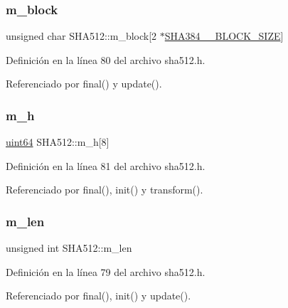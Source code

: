 \subsubsection{\texorpdfstring{m\+\_\+block}{m\_block}}
{\footnotesize\ttfamily unsigned char S\+H\+A512\+::m\+\_\+block\mbox{[}2 $\ast$\hyperlink{classSHA512_a5191f35aa313f5fd0447d2c272a82c99}{S\+H\+A384\+\_\+\_\+\+B\+L\+O\+C\+K\+\_\+\+S\+I\+ZE}\mbox{]}\hspace{0.3cm}{\ttfamily [protected]}}



Definición en la línea 80 del archivo sha512.\+h.



Referenciado por final() y update().

\hypertarget{classSHA512_a6fcfcd454382329628cd6baa0487bee5}{}\label{classSHA512_a6fcfcd454382329628cd6baa0487bee5} 
\subsubsection{\texorpdfstring{m\+\_\+h}{m\_h}}
{\footnotesize\ttfamily \hyperlink{classSHA512_af8e6d233ae15030174e481d6d79b1786}{uint64} S\+H\+A512\+::m\+\_\+h\mbox{[}8\mbox{]}\hspace{0.3cm}{\ttfamily [protected]}}



Definición en la línea 81 del archivo sha512.\+h.



Referenciado por final(), init() y transform().

\hypertarget{classSHA512_ac08a6cd41b96a9ca98ca567c3225bdca}{}\label{classSHA512_ac08a6cd41b96a9ca98ca567c3225bdca} 
\subsubsection{\texorpdfstring{m\+\_\+len}{m\_len}}
{\footnotesize\ttfamily unsigned int S\+H\+A512\+::m\+\_\+len\hspace{0.3cm}{\ttfamily [protected]}}



Definición en la línea 79 del archivo sha512.\+h.



Referenciado por final(), init() y update().

